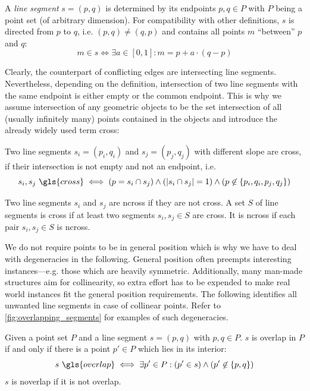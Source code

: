 \begin{definition}
  A \emph{line segment} \(s=(p,q)\) is determined by its endpoints
  \(p,q\in P\) with \(P\) being a point set (of arbitrary dimension). 
  For compatibility with other definitions,
  \(s\) is directed from \(p\) to \(q\), i.e. \((p,q)\not=(q,p)\)
  and contains all points \(m\) ``between'' \(p\) and \(q\):
  \[ m \in s \iff \exists a\in [0,1] : m = p + a \cdot (q-p) \]
\end{definition}

Clearly, the counterpart of conflicting edges are intersecting line
segments. Nevertheless, depending on the definition, intersection of
two line segments with the same endpoint is either empty or the common endpoint.
This is why we assume intersection of any geometric objects to be the
set intersection of all (usually infinitely many) points contained in
the objects and introduce the already widely used term \gls{cross}:

\begin{definition}[Crossing]\label{def:crossing}
  Two line segments \(s_i=(p_i,q_i)\) and \(s_j=(p_j,q_j)\) with 
  different slope are \gls{cross}, if their intersection is not empty
  and not an endpoint, i.e.
  \[
    s_i, s_j~\gls{cross}
    \iff
    (p = s_i\cap s_j) \land
    (|s_i\cap s_j| = 1) \land
    (p \not\in \{p_i,q_i,p_j,q_j\})
  \]

  Two line segments \(s_i\) and \(s_j\) are \gls{ncross}
  if they are not \gls{cross}.
  A set \(S\) of line segments is \gls{cross}
  if at least two segments \(s_i, s_j \in S\) are \gls{cross}.
  It is \gls{ncross} if each pair \(s_i, s_j \in S\) is \gls{ncross}.
\end{definition}

We do not require points to be in general position which is why we
have to deal with degeneracies in the following. General position
often preempts interesting instances---e.g. those which are heavily
symmetric. Additionally, many man-made structures aim for
collinearity, so extra effort has to be expended to make real world
instances fit the general position requirements. The following
 identifies all unwanted line
segments in case of collinear points. Refer to
\cref{fig:overlapping_segments} for examples of such degeneracies.

\begin{definition}
  \label{def:overlapping_segments}
  Given a point set \(P\) and a line segment \(s = (p,q)\) with
  \(p,q \in P\). \(s\) is \gls{overlap} in \(P\) if and only if
  there is a point \(p' \in P\) which lies in its interior:
  \[
    s~\gls{overlap}
    \iff  \exists p' \in P : (p' \in s) \land (p' \not\in \{p,q\})
  \]
  \(s\) is \gls{noverlap} if it is not \gls{overlap}.
\end{definition}

